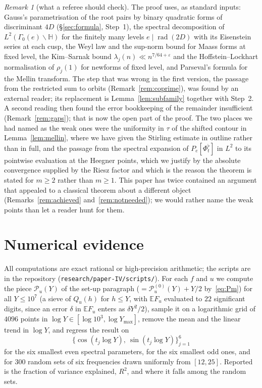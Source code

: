 \documentclass[11pt,a4paper]{article}
\theoremstyle{remark}\newtheorem{remark}[theorem]{Remark}
\begin{document}
\begin{remark}[what a referee should check]\label{rem:referee}
The proof uses, as standard inputs: Gauss's parametrisation of the root pairs by binary quadratic forms of
discriminant $4D$ (\S\ref{sec:formula}, Step~1), the spectral decomposition of $L^2(\Gamma_0(e)\backslash\mathbb H)$
for the finitely many levels $e\mid\operatorname{rad}(2D)$ with its Eisenstein series at each cusp, the Weyl law and the
sup-norm bound for Maass forms at fixed level, the Kim--Sarnak bound $\lambda_j(n)\ll n^{7/64+\varepsilon}$ and the
Hoffstein--Lockhart normalisation of $\rho_j(1)$ for newforms of fixed level, and Parseval's formula for the Mellin
transform. The step that was wrong in the first version, the passage from the
restricted sum to orbits (Remark~\ref{rem:coprime}), was found by an external reader; its replacement is
Lemma~\ref{lem:subfamily} together with Step~2. A second reading then found the error bookkeeping of the remainder
insufficient (Remark~\ref{rem:gaps}); that is now the open part of the proof. The two places we had named as the
weak ones were the uniformity in
$\tau$ of the shifted contour in Lemma~\ref{lem:mellin}, where we have given the Stirling estimate in outline rather
than in full, and the passage from the spectral expansion of $P_e[\Phi^\flat_t]$ in $L^2$ to its pointwise evaluation at
the Heegner points, which we justify by the absolute convergence supplied by the Riesz factor and which is the reason
the theorem is stated for $m\ge2$ rather than $m\ge1$. This paper has twice contained an argument that appealed to a
classical theorem about a different object (Remarks~\ref{rem:achieved} and~\ref{rem:notneeded}); we would rather name
the weak points than let a reader hunt for them.
\end{remark}

\section{Numerical evidence}\label{sec:numerics}

All computations are exact rational or high-precision arithmetic; the scripts are in the repository
(\texttt{research/paper-IV/scripts/}). For each $f$ and $u$ we compute the piece $\mathcal P_u(Y)$ of the set-up paragraph ($=\mathcal P^{(0)}_u(Y)+Y/2$
by~\eqref{eq:Pm}) for all $Y\le10^7$
(a sieve of $Q_u(h)$ for $h\le Y$, with $\mathbb EF_u$ evaluated to $22$ significant digits, since an error
$\delta$ in $\mathbb EF_u$ enters as $\delta Y^2/2$), sample it on a logarithmic grid of $4096$ points in
$\log Y\in[\log10^3,\log Y_{\max}]$, remove the mean and the linear trend in $\log Y$, and regress the result on
\[
\bigl\{\cos(t_j\log Y),\ \sin(t_j\log Y)\bigr\}_{j=1}^{6}
\]
for the six smallest even spectral parameters, for the six smallest odd ones, and for $300$ random sets of six
frequencies drawn uniformly from $[12,25]$. Reported is the fraction of variance explained, $R^2$, and where it falls
among the random sets.
\end{document}

